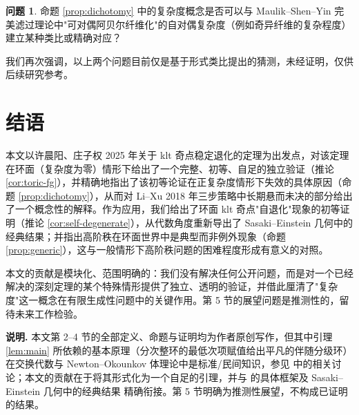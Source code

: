 \documentclass[11pt,a4paper]{article}
\theoremstyle{definition}
\newtheorem{question}[theorem]{问题}
\theoremstyle{remark}
\begin{document}
\begin{question}
命题 \ref{prop:dichotomy} 中的复杂度概念是否可以与 Maulik--Shen--Yin 完美滤过理论中"可对偶阿贝尔纤维化"的自对偶复杂度（例如奇异纤维的复杂程度）建立某种类比或精确对应？
\end{question}

我们再次强调，以上两个问题目前仅是基于形式类比提出的猜测，未经证明，仅供后续研究参考。

\section{结语}

本文以许晨阳、庄子权 2025 年关于 klt 奇点稳定退化的定理为出发点，对该定理在环面（复杂度为零）情形下给出了一个完整、初等、自足的独立验证（推论 \ref{cor:toric-fg}），并精确地指出了该初等论证在正复杂度情形下失效的具体原因（命题 \ref{prop:dichotomy}），从而对 Li--Xu 2018 年三步策略中长期悬而未决的部分给出了一个概念性的解释。作为应用，我们给出了环面 klt 奇点"自退化"现象的初等证明（推论 \ref{cor:self-degenerate}），从代数角度重新导出了 Sasaki--Einstein 几何中的经典结果；并指出高阶秩在环面世界中是典型而非例外现象（命题 \ref{prop:generic}），这与一般情形下高阶秩问题的困难程度形成有意义的对照。

本文的贡献是模块化、范围明确的：我们没有解决任何公开问题，而是对一个已经解决的深刻定理的某个特殊情形提供了独立、透明的验证，并借此厘清了"复杂度"这一概念在有限生成性问题中的关键作用。第 5 节的展望问题是推测性的，留待未来工作检验。

\bigskip
\noindent\textbf{说明.} 本文第 2--4 节的全部定义、命题与证明均为作者原创写作，但其中引理 \ref{lem:main} 所依赖的基本原理（分次整环的最低次项赋值给出平凡的伴随分级环）在交换代数与 Newton--Okounkov 体理论中是标准/民间知识，参见 \cite{KK2012,KM2019} 中的相关讨论；本文的贡献在于将其形式化为一个自足的引理，并与 \cite{XZ2025,LX2018,XZ2021} 的具体框架及 Sasaki--Einstein 几何中的经典结果 \cite{MSY2008,FOW2009} 精确衔接。第 5 节明确为推测性展望，不构成已证明的结果。
\end{document}
